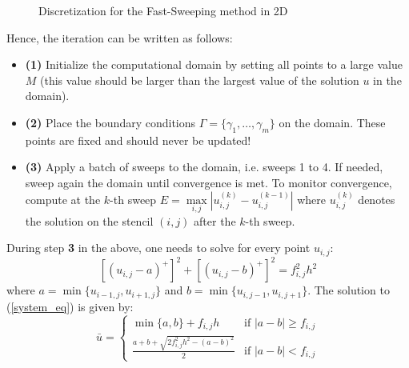 \documentclass[11pt]{article}
\theoremstyle{definition}
\theoremstyle{remark}
\begin{document}
\begin{figure}[h!]
    \centering
    \caption{Discretization for the Fast-Sweeping method in 2D}
    \label{fig:graph_discretization}
\end{figure}

Hence, the iteration can be written as follows:
\begin{itemize}
    \item \textbf{(1)} Initialize the computational domain by setting all points to a large value $M$ (this value should be larger than the largest value of the solution $u$ in the domain).
    \item \textbf{(2)} Place the boundary conditions $\Gamma=\{\gamma_1,\dots,\gamma_m\}$ on the domain. These points are fixed and should never be updated!
    \item \textbf{(3)} Apply a batch of sweeps to the domain, i.e. sweeps 1 to 4. If needed, sweep again the domain until convergence is met. To monitor convergence, compute at the $k$-th sweep $E = \max\limits_{i,j} \left| u_{i,j}^{(k)} - u_{i,j}^{(k-1)} \right|$ where $u_ {i,j}^{(k)}$ denotes the solution on the stencil $(i,j)$ after the $k$-th sweep.
\end{itemize}
\noindent During step \textbf{3} in the above, one needs to solve for every point $u_{i,j}$:
\begin{equation}
\label{system_eq}
    [(u_{i,j}-a)^{+}]^2+[(u_{i,j}-b)^{+}]^2=f_{i,j}^2h^2
\end{equation}
\noindent where $a=\min\{u_{i-1,j},u_{i+1,j}\}$ and $b=\min\{u_{i,j-1},u_{i,j+1}\}$. The solution to (\ref{system_eq}) is given by:
\begin{equation*}
    \bar{u}=\begin{cases}
        \min\{a,b\}+f_{i,j}h & \text {if }|a-b|\geq f_{i,j} \\
        \frac{a+b+\sqrt{2f_{i,j}^2h^2-(a-b)^2}}{2} & \text {if }|a-b|< f_{i,j}
    \end{cases}
\end{equation*}
\end{document}
